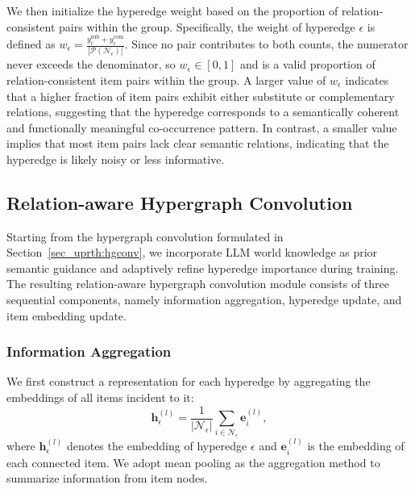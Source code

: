 We then initialize the hyperedge weight based on the proportion of relation-consistent pairs within the group. Specifically, the weight of hyperedge $\epsilon$ is defined as $w_\epsilon = \frac{y^{\text{sub}}_\epsilon+y^{\text{com}}_\epsilon}{|\mathcal{P}(\mathcal{N}_\epsilon)|}$. Since no pair contributes to both counts, the numerator never exceeds the denominator, so $w_\epsilon \in [0,1]$ and is a valid proportion of relation-consistent item pairs within the group. A larger value of $w_\epsilon$ indicates that a higher fraction of item pairs exhibit either substitute or complementary relations, suggesting that the hyperedge corresponds to a semantically coherent and functionally meaningful co-occurrence pattern. In contrast, a smaller value implies that most item pairs lack clear semantic relations, indicating that the hyperedge is likely noisy or less informative.

\subsection{Relation-aware Hypergraph Convolution}
Starting from the hypergraph convolution formulated in Section~\ref{sec_uprth:hgconv}, we incorporate LLM world knowledge as prior semantic guidance and adaptively refine hyperedge importance during training. The resulting relation-aware hypergraph convolution module consists of three sequential components, namely information aggregation, hyperedge update, and item embedding update.

\subsubsection{Information Aggregation}
We first construct a representation for each hyperedge by aggregating the embeddings of all items incident to it: 
\begin{equation}
    \mathbf{h}_\epsilon^{(l)} = \frac{1}{|\mathcal{N}_\epsilon|} \sum_{i \in \mathcal{N}_\epsilon} \mathbf{e}_{i}^{(l)},
\end{equation}
where $\mathbf{h}_\epsilon^{(l)}$ denotes the embedding of hyperedge $\epsilon$ and $\mathbf{e}_{i}^{(l)}$ is the embedding of each connected item. We adopt mean pooling as the aggregation method to summarize information from item nodes.

